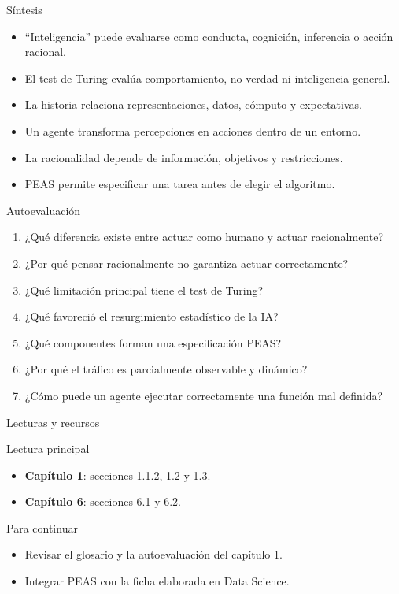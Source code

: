 \documentclass[aspectratio=169,11pt]{beamer}
\begin{document}
\begin{frame}{Síntesis}
  \begin{itemize}
    \item ``Inteligencia'' puede evaluarse como conducta, cognición, inferencia o acción racional.
    \item El test de Turing evalúa comportamiento, no verdad ni inteligencia general.
    \item La historia relaciona representaciones, datos, cómputo y expectativas.
    \item Un agente transforma percepciones en acciones dentro de un entorno.
    \item La racionalidad depende de información, objetivos y restricciones.
    \item PEAS permite especificar una tarea antes de elegir el algoritmo.
  \end{itemize}
\end{frame}

\begin{frame}{Autoevaluación}
  \small
  \begin{enumerate}
    \item ¿Qué diferencia existe entre actuar como humano y actuar racionalmente?
    \item ¿Por qué pensar racionalmente no garantiza actuar correctamente?
    \item ¿Qué limitación principal tiene el test de Turing?
    \item ¿Qué favoreció el resurgimiento estadístico de la IA?
    \item ¿Qué componentes forman una especificación PEAS?
    \item ¿Por qué el tráfico es parcialmente observable y dinámico?
    \item ¿Cómo puede un agente ejecutar correctamente una función mal definida?
  \end{enumerate}
\end{frame}

\begin{frame}{Lecturas y recursos}
  \begin{block}{Lectura principal}
    \begin{itemize}
      \item \textbf{Capítulo 1}: secciones 1.1.2, 1.2 y 1.3.
      \item \textbf{Capítulo 6}: secciones 6.1 y 6.2.
    \end{itemize}
  \end{block}
  \begin{block}{Para continuar}
    \begin{itemize}
      \item Revisar el glosario y la autoevaluación del capítulo 1.
      \item Integrar PEAS con la ficha elaborada en Data Science.
    \end{itemize}
  \end{block}
\end{frame}
\end{document}
